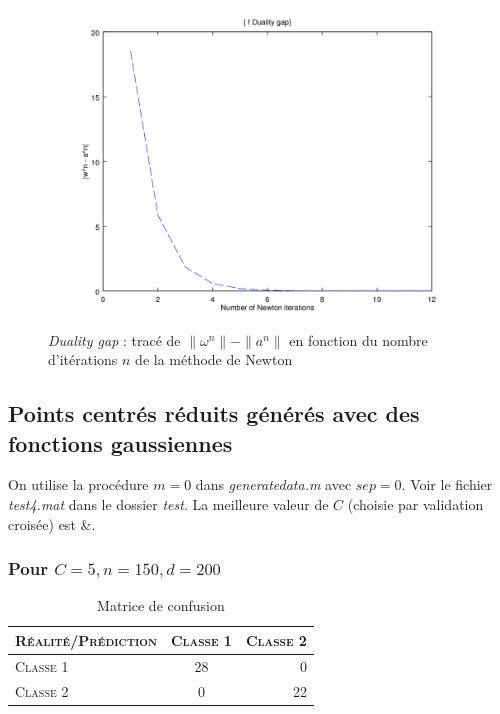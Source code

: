 \documentclass{article}
\begin{document}
         \begin{figure}
           \begin{center}
             \includegraphics[scale=0.5]{images/duality3.png}
             \caption{\emph{Duality gap} : tracé de $\|\omega^n\| - \|a^n\|$ en fonction du nombre d'itérations $n$ de la méthode de Newton}
           \end{center}
         \end{figure}


\subsection{Points centrés réduits générés avec des fonctions gaussiennes}

On utilise la procédure $m=0$ dans \emph{generatedata.m} avec $sep=0$. Voir le fichier \emph{test4.mat} dans le dossier \emph{test}. La meilleure valeur de $C$ (choisie par validation croisée) est &.

\subsubsection{Pour $C=5, n=150, d=200$}

     \begin{table}[H]
       \caption{Matrice de confusion}
       \begin{tabular}{|l|c|r|}
         \hline
         \textsc{Réalité/Prédiction} & \textsc{Classe 1} & \textsc{Classe 2}\\
         \hline
         \textsc{Classe 1} & 28 & 0\\
         \hline
         \textsc{Classe 2} & 0 & 22\\
         \hline
       \end{tabular}
     \end{table}
\end{document}
